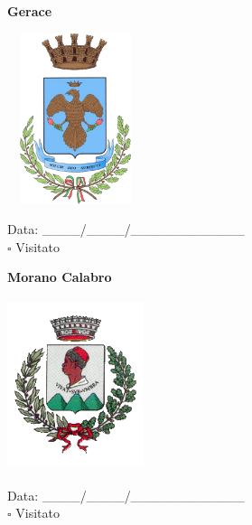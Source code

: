 \documentclass[a5paper,12pt]{article}
\begin{document}
\vspace{0.7cm}

\noindent
\begin{minipage}[t]{0.45\textwidth}
    \begin{center}
        \textbf{Gerace}
    \end{center}
    \vspace{-0.5cm} %
    \begin{center}
        \includegraphics[height= 5cm, width=4cm]{Calabria/Gerace-Stemma.png}
    \end{center}
    \vspace{-0.4cm} %
    \begin{flushleft}
        Data: \_\_\_\_/\_\_\_\_/\_\_\_\_\_\_\_\_\_\_\_\_ \\
        $\square$ Visitato
    \end{flushleft}
\end{minipage}
\hfill
\noindent
\begin{minipage}[t]{0.45\textwidth}
    \begin{center}
        \textbf{Morano Calabro}
    \end{center}
    \vspace{-0.5cm} %
    \begin{center}
        \includegraphics[height= 5cm, width=4cm]{Calabria/Morano_Calabro-Stemma.png}
    \end{center}
    \vspace{-0.4cm} %
    \begin{flushleft}
        Data: \_\_\_\_/\_\_\_\_/\_\_\_\_\_\_\_\_\_\_\_\_ \\
        $\square$ Visitato
    \end{flushleft}
\end{minipage}
\end{document}
